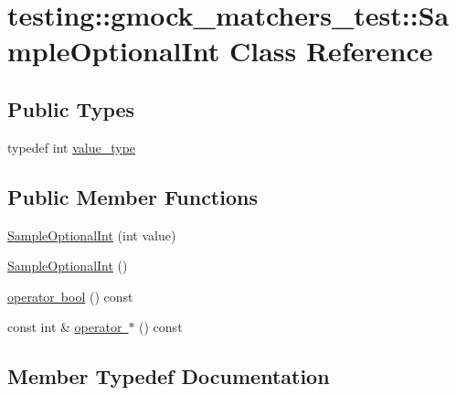 \hypertarget{classtesting_1_1gmock__matchers__test_1_1SampleOptionalInt}{}\section{testing\+::gmock\+\_\+matchers\+\_\+test\+::Sample\+Optional\+Int Class Reference}
\label{classtesting_1_1gmock__matchers__test_1_1SampleOptionalInt}
\subsection*{Public Types}
\begin{DoxyCompactItemize}
\item 
typedef int \mbox{\hyperlink{classtesting_1_1gmock__matchers__test_1_1SampleOptionalInt_a9f1309a849993c56be680fc5468bf01a}{value\+\_\+type}}
\end{DoxyCompactItemize}
\subsection*{Public Member Functions}
\begin{DoxyCompactItemize}
\item 
\mbox{\hyperlink{classtesting_1_1gmock__matchers__test_1_1SampleOptionalInt_aa0e9539a55f97693e24230e5857f7297}{Sample\+Optional\+Int}} (int value)
\item 
\mbox{\hyperlink{classtesting_1_1gmock__matchers__test_1_1SampleOptionalInt_a4181e03aaad80004e9c97394cb610565}{Sample\+Optional\+Int}} ()
\item 
\mbox{\hyperlink{classtesting_1_1gmock__matchers__test_1_1SampleOptionalInt_a1e638b606b7e48b395a76304153c8f17}{operator bool}} () const
\item 
const int \& \mbox{\hyperlink{classtesting_1_1gmock__matchers__test_1_1SampleOptionalInt_a5e97f4536a008ab6f86b842a1e697532}{operator $\ast$}} () const
\end{DoxyCompactItemize}


\subsection{Member Typedef Documentation}
\mbox{\label{classtesting_1_1gmock__matchers__test_1_1SampleOptionalInt_a9f1309a849993c56be680fc5468bf01a}} 
